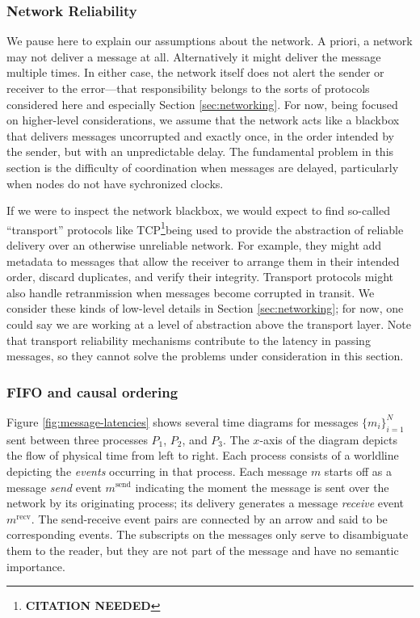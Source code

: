 \documentclass[]             %
{NASA}                       %
\theoremstyle{definition}
\newcommand{\citationneeded}{\footnote{\textbf{CITATION NEEDED}}}
\begin{document}
\subsubsection{Network Reliability}
We pause here to explain our assumptions about the network.  A priori,
a network may not deliver a message at all. Alternatively it might
deliver the message multiple times. In either case, the network itself
does not alert the sender or receiver to the error---that
responsibility belongs to the sorts of protocols considered here and
especially Section \ref{sec:networking}. For now, being focused on
higher-level considerations, we assume that the network acts like a
blackbox that delivers messages uncorrupted and exactly once, in the
order intended by the sender, but with an unpredictable delay. The
fundamental problem in this section is the difficulty of coordination
when messages are delayed, particularly when nodes do not have
sychronized clocks.

If we were to inspect the network blackbox, we would expect to find
so-called ``transport'' protocols like TCP\citationneeded being used
to provide the abstraction of reliable delivery over an otherwise
unreliable network. For example, they might add metadata to messages
that allow the receiver to arrange them in their intended order,
discard duplicates, and verify their integrity. Transport protocols
might also handle retranmission when messages become corrupted in
transit. We consider these kinds of low-level details in Section
\ref{sec:networking}; for now, one could say we are working at a level
of abstraction above the transport layer. Note that transport
reliability mechanisms contribute to the latency in passing messages,
so they cannot solve the problems under consideration in this section.

\subsubsection{FIFO and causal ordering}

Figure \ref{fig:message-latencies} shows several time diagrams for
messages $\{m_i\}_{i=1}^N$ sent between three processes $P_1$, $P_2$,
and $P_3$. The $x$-axis of the diagram depicts the flow of physical
time from left to right. Each process consists of a worldline
depicting the \emph{events} occurring in that process. Each message
$m$ starts off as a message \emph{send} event $m^\textrm{send}$
indicating the moment the message is sent over the network by its
originating process; its delivery generates a message \emph{receive}
event $m^\textrm{recv}$. The send-receive event pairs are connected by
an arrow and said to be corresponding events. The subscripts on the
messages only serve to disambiguate them to the reader, but they are
not part of the message and have no semantic importance.
\end{document}
